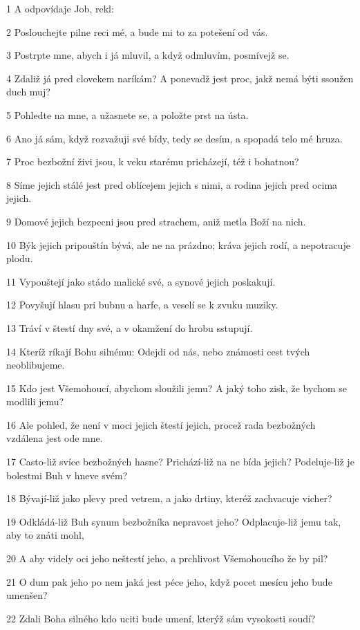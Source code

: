 \par 1 A odpovídaje Job, rekl:
\par 2 Poslouchejte pilne reci mé, a bude mi to za potešení od vás.
\par 3 Postrpte mne, abych i já mluvil, a když odmluvím, posmívejž se.
\par 4 Zdaliž já pred clovekem naríkám? A ponevadž jest proc, jakž nemá býti ssoužen duch muj?
\par 5 Pohledte na mne, a užasnete se, a položte prst na ústa.
\par 6 Ano já sám, když rozvažuji své bídy, tedy se desím, a spopadá telo mé hruza.
\par 7 Proc bezbožní živi jsou, k veku starému pricházejí, též i bohatnou?
\par 8 Síme jejich stálé jest pred oblícejem jejich s nimi, a rodina jejich pred ocima jejich.
\par 9 Domové jejich bezpecni jsou pred strachem, aniž metla Boží na nich.
\par 10 Býk jejich pripouštín bývá, ale ne na prázdno; kráva jejich rodí, a nepotracuje plodu.
\par 11 Vypouštejí jako stádo malické své, a synové jejich poskakují.
\par 12 Povyšují hlasu pri bubnu a harfe, a veselí se k zvuku muziky.
\par 13 Tráví v štestí dny své, a v okamžení do hrobu sstupují.
\par 14 Kteríž ríkají Bohu silnému: Odejdi od nás, nebo známosti cest tvých neoblibujeme.
\par 15 Kdo jest Všemohoucí, abychom sloužili jemu? A jaký toho zisk, že bychom se modlili jemu?
\par 16 Ale pohled, že není v moci jejich štestí jejich, procež rada bezbožných vzdálena jest ode mne.
\par 17 Casto-liž svíce bezbožných hasne? Prichází-liž na ne bída jejich? Podeluje-liž je bolestmi Buh v hneve svém?
\par 18 Bývají-liž jako plevy pred vetrem, a jako drtiny, kteréž zachvacuje vicher?
\par 19 Odkládá-liž Buh synum bezbožníka nepravost jeho? Odplacuje-liž jemu tak, aby to znáti mohl,
\par 20 A aby videly oci jeho neštestí jeho, a prchlivost Všemohoucího že by pil?
\par 21 O dum pak jeho po nem jaká jest péce jeho, když pocet mesícu jeho bude umenšen?
\par 22 Zdali Boha silného kdo uciti bude umení, kterýž sám vysokosti soudí?
